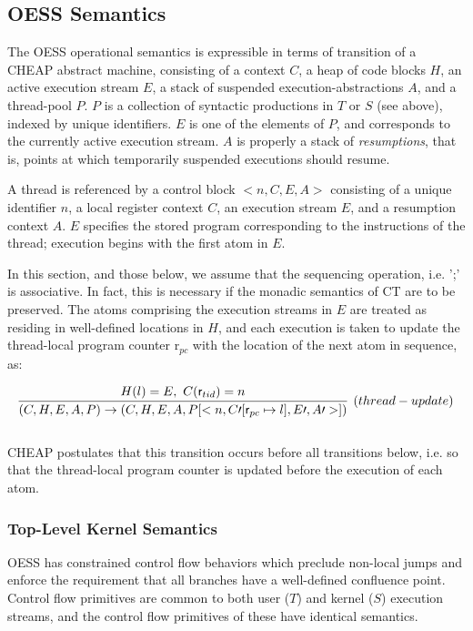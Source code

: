 \documentclass{article}
\newcommand{\rtid}[0]{\textsf{r$_{tid}$}}
\newcommand{\rpc}[0]{\textsf{r$_{pc}$}}
\begin{document}
\subsection{OESS Semantics}

The OESS operational semantics is expressible in terms of transition of a CHEAP abstract machine, consisting of a context $C$, a heap of code blocks $H$, an active execution stream $E$, a stack of suspended execution-abstractions $A$, and a thread-pool $P$.  $P$ is a collection of syntactic productions in $T$ or $S$ (see above), indexed by unique identifiers.  $E$ is one of the elements of $P$, and corresponds to the currently active execution stream.  $A$ is properly a stack of \emph{resumptions}, that is, points at which temporarily suspended executions should resume.

A thread is referenced by a control block $<n, C, E, A>$ consisting of a unique identifier $n$, a local register context $C$, an execution stream $E$, and a resumption context $A$.  $E$ specifies the stored program corresponding to the instructions of the thread; execution begins with the first atom in $E$.

In this section, and those below, we assume that the sequencing operation, i.e. '\textsf{;}' is associative.  In fact, this is necessary if the monadic semantics of CT are to be preserved.  The atoms comprising the execution streams in $E$ are treated as residing in well-defined locations in $H$, and each execution is taken to update the thread-local program counter \textsf{r$_{pc}$} with the location of the next atom in sequence, as:

\begin{displaymath}
\infer[(thread-update)]
{(C, H, E, A, P) \rightarrow (C, H, E, A, P[<n, C\prime[\rpc \mapsto l], E\prime, A\prime>])}
{H(l) = E, \ C(\rtid) = n}
\\
\end{displaymath}
\\

CHEAP postulates that this transition occurs before all transitions below, i.e. so that the thread-local program counter is updated before the execution of each atom.

\subsubsection{Top-Level Kernel Semantics}

OESS has constrained control flow behaviors which preclude non-local jumps and enforce the requirement that all branches have a well-defined confluence point.  Control flow primitives are common to both user ($T$) and kernel ($S$) execution streams, and the control flow primitives of these have identical semantics.
\end{document}
